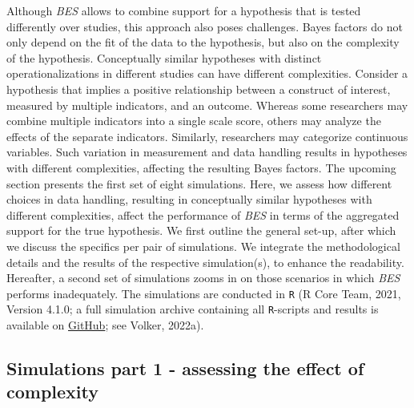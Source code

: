 \documentclass[
]{interact}
\begin{document}
Although \emph{BES} allows to combine support for a hypothesis that is
tested differently over studies, this approach also poses challenges.
Bayes factors do not only depend on the fit of the data to the
hypothesis, but also on the complexity of the hypothesis. Conceptually
similar hypotheses with distinct operationalizations in different
studies can have different complexities. Consider a hypothesis that
implies a positive relationship between a construct of interest,
measured by multiple indicators, and an outcome. Whereas some
researchers may combine multiple indicators into a single scale score,
others may analyze the effects of the separate indicators. Similarly,
researchers may categorize continuous variables. Such variation in
measurement and data handling results in hypotheses with different
complexities, affecting the resulting Bayes factors. The upcoming
section presents the first set of eight simulations. Here, we assess how
different choices in data handling, resulting in conceptually similar
hypotheses with different complexities, affect the performance of
\emph{BES} in terms of the aggregated support for the true hypothesis.
We first outline the general set-up, after which we discuss the
specifics per pair of simulations. We integrate the methodological
details and the results of the respective simulation(s), to enhance the
readability. Hereafter, a second set of simulations zooms in on those
scenarios in which \emph{BES} performs inadequately. The simulations are
conducted in \texttt{R} (R Core Team, 2021, Version 4.1.0; a full
simulation archive containing all \texttt{R}-scripts and results is
available on
\href{https://www.github.com/thomvolker/Master_Thesis/tree/master/MSBBSS/simulations}{GitHub};
see Volker, 2022a).

\hypertarget{simulations-part-1---assessing-the-effect-of-complexity}{%
\subsection{Simulations part 1 - assessing the effect of
complexity}\label{simulations-part-1---assessing-the-effect-of-complexity}}
\end{document}
